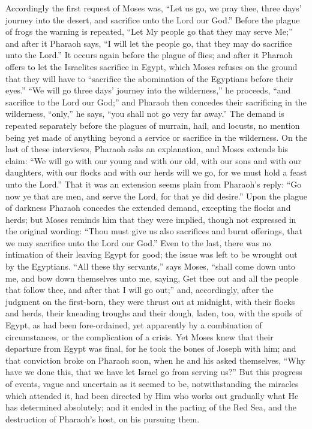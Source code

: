 Accordingly the first request of Moses was, ``Let
us go, we pray thee, three days' journey into the desert,
and sacrifice unto the Lord our God.'' Before the
plague of frogs the warning is repeated, ``Let My
people go that they may serve Me;'' and after it
Pharaoh says, ``I will let the people go, that they
may do sacrifice unto the Lord.'' It occurs again
before the plague of flies; and after it Pharaoh offers
to let the Israelites sacrifice in Egypt, which Moses
refuses on the ground that they will have to
``sacrifice the abomination of the Egyptians before
their eyes.'' ``We will go three days' journey
into the wilderness,'' he proceeds, ``and
sacrifice to the Lord our God;'' and Pharaoh then
concedes their sacrificing in the wilderness,
``only,'' he says, ``you shall not go very
far away.'' The demand is repeated separately before
the plagues of murrain, hail, and locusts, no mention
being yet made of anything beyond a service or sacrifice
in the wilderness. On the last of these interviews,
Pharaoh asks an explanation, and Moses extends his claim:
``We will go with our young and with our old, with
our sons and with our daughters, with our flocks and with
our herds will we go, for we must hold a feast unto the
Lord.'' That it was an extension seems plain from
Pharaoh's reply: ``Go now ye that are men, and serve
the Lord, for that ye did desire.'' Upon the plague
of darkness Pharaoh concedes the extended demand,
excepting the flocks and herds; but Moses reminds him
that they were implied, though not expressed in the
original wording: ``Thou must give us also sacrifices
and burnt offerings, that we may sacrifice unto the Lord
our God.'' Even to the last, there was no intimation
of their leaving Egypt for good; the issue was left to be
wrought out by the Egyptians. ``All these thy
servants,'' says Moses, ``shall come down unto
me, and bow down themselves unto me, saying, Get thee out
and all the people that follow thee, and after that I
will go out;'' and, accordingly, after the judgment
on the first-born, they were thrust out at midnight, with
their flocks and herds, their kneading troughs and their
dough, laden, too, with the spoils of Egypt, as had been
fore-ordained, yet apparently by a combination of
circumstances, or the complication of a crisis. Yet Moses
knew that their departure from Egypt was final, for he
took the bones of Joseph with him; and that conviction
broke on Pharaoh soon, when he and his asked themselves,
``Why have we done this, that we have let Israel go
from serving us?'' But this progress of events, vague
and uncertain as it seemed to be, notwithstanding the
miracles which attended it, had been directed by Him who
works out gradually what He has determined absolutely;
and it ended in the parting of the Red Sea, and the
destruction of Pharaoh's host, on his pursuing them.

